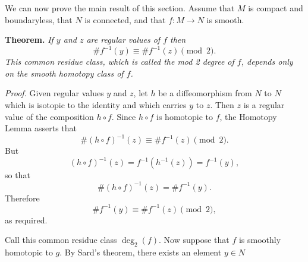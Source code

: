 We can now prove the main result of this section. Assume that $M$ is compact and boundaryless, that $N$ is connected, and that $f : M \to N$ is smooth.

\noindent\textbf{Theorem.} \textit{If $y$ and $z$ are regular values of $f$ then}
\[
\#f^{-1}(y) \equiv \#f^{-1}(z) \pmod{2}.
\]
\textit{This common residue class, which is called the \emph{mod 2 degree} of $f$, depends only on the smooth homotopy class of $f$.}

\noindent\textit{Proof.}
Given regular values $y$ and $z$, let $h$ be a diffeomorphism from $N$ to $N$ which is isotopic to the identity and which carries $y$ to $z$. Then $z$ is a regular value of the composition $h \circ f$. Since $h \circ f$ is homotopic to $f$, the Homotopy Lemma asserts that
\[
\#(h \circ f)^{-1}(z) \equiv \#f^{-1}(z) \pmod{2}.
\]
But
\[
(h \circ f)^{-1}(z) = f^{-1}(h^{-1}(z)) = f^{-1}(y),
\]
so that
\[
\#(h \circ f)^{-1}(z) = \#f^{-1}(y).
\]
Therefore
\[
\#f^{-1}(y) \equiv \#f^{-1}(z) \pmod{2},
\]
as required.

Call this common residue class $\deg_2(f)$. Now suppose that $f$ is smoothly homotopic to $g$. By Sard's theorem, there exists an element $y \in N$


